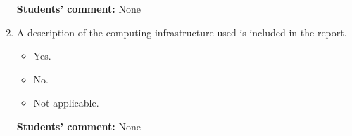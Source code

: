 \documentclass[10pt]{article}
\begin{document}
\begin{enumerate}
    \textbf{Students' comment:} None
    
    \item A description of the computing infrastructure used is included in the report.
    \begin{itemize}
        \item [\faCheckSquareO] Yes.
        \item [\faSquareO] No.
        \item [\faSquareO] Not applicable.
    \end{itemize}
    
    \textbf{Students' comment:} None
\end{enumerate}
\end{document}
